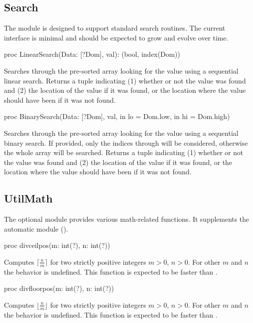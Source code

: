 \subsection{Search}
\label{Search}

The  module is designed to support standard search
routines.  The current interface is minimal and should be expected to
grow and evolve over time.

\begin{protohead}
proc LinearSearch(Data: [?Dom], val): (bool, index(Dom))
\end{protohead}
\begin{protobody}
Searches through the pre-sorted array  looking for the
value  using a sequential linear search.  Returns a tuple
indicating (1) whether or not the value was found and (2) the location
of the value if it was found, or the location where the value should
have been if it was not found.
\end{protobody}

\begin{protohead}
proc BinarySearch(Data: [?Dom], val, in lo = Dom.low, in hi = Dom.high)
\end{protohead}
\begin{protobody}
Searches through the pre-sorted array  looking for the
value  using a sequential binary search.  If provided, only
the indices  through  will be considered, otherwise
the whole array will be searched.  Returns a tuple indicating (1)
whether or not the value was found and (2) the location of the value
if it was found, or the location where the value should have been if
it was not found.
\end{protobody}


\subsection{UtilMath}
\label{StdModules_UtilMath}

The optional module  provides various math-related functions.
It supplements the automatic  module ().

\begin{protohead}
proc divceilpos(m: int(?), n: int(?))
\end{protohead}
\begin{protobody}
Computes
$\lceil\frac{n}{m}\rceil$
for two strictly positive integers $m>0$, $n>0$.
For other $m$ and $n$ the behavior is undefined.
This function is expected to be faster than .
\end{protobody}

\begin{protohead}
proc divfloorpos(m: int(?), n: int(?))
\end{protohead}
\begin{protobody}
Computes
$\lfloor\frac{n}{m}\rfloor$
for two strictly positive integers $m>0$, $n>0$.
For other $m$ and $n$ the behavior is undefined.
This function is expected to be faster than .
\end{protobody}


